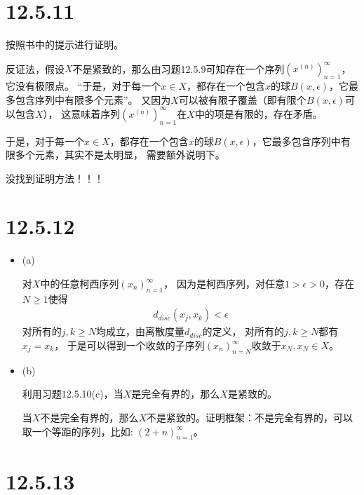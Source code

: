 \documentclass{article}
\begin{document}
\section*{12.5.11}

按照书中的提示进行证明。

反证法，假设$X$不是紧致的，那么由习题12.5.9可知存在一个序列$(x^{(n)})_{n = 1}^\infty$，它没有极限点。
“于是，对于每一个$x \in X$，都存在一个包含$x$的球$B(x, \epsilon)$，它最多包含序列中有限多个元素”。
又因为$X$可以被有限子覆盖（即有限个$B(x, \epsilon)$可以包含$X$），
这意味着序列$(x^{(n)})_{n = 1}^\infty$在$X$中的项是有限的，存在矛盾。

\begin{zremark}
  于是，对于每一个$x \in X$，都存在一个包含$x$的球$B(x, \epsilon)$，它最多包含序列中有限多个元素，其实不是太明显，
  需要额外说明下。

  没找到证明方法！！！
\end{zremark}

\section*{12.5.12}

\begin{itemize}
  \item (a)

        对$X$中的任意柯西序列$(x_n)_{n = 1}^\infty$，
        因为是柯西序列，对任意$1 > \epsilon > 0$，存在$N \geq 1$使得
        \begin{align*}
          d_{disc}(x_j, x_k) < \epsilon
        \end{align*}
        对所有的$j,k \geq N$均成立，由离散度量$d_{disc}$的定义，
        对所有的$j,k \geq N$都有$x_j = x_k$，
        于是可以得到一个收敛的子序列$(x_{n})_{n = N}^\infty$收敛于$x_N, x_N \in X$。

  \item (b)

        利用习题12.5.10(c)，当$X$是完全有界的，那么$X$是紧致的。

        当$X$不是完全有界的，那么$X$不是紧致的。证明框架：不是完全有界的，可以取一个等距的序列，比如: $(2 + n)_{n = 1}^\infty$。


\end{itemize}

\section*{12.5.13}
\end{document}
